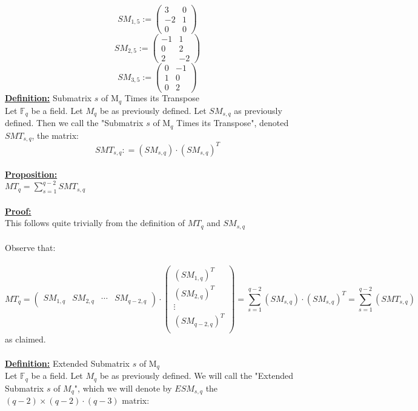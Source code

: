 \documentclass[11pt]{article}
\theoremstyle{plain}
\theoremstyle{definition}
\begin{document}
\[ SM_{1,5} := \left( \begin{array}{cc}
3  & 0  \\
-2 &   1   \\
0 &  0    \end{array} \right)\] 
\[ SM_{2,5} := \left( \begin{array}{cc}
-1  & 1  \\
0 &   2   \\
2 &  -2    \end{array} \right)\] 
\[ SM_{3,5} := \left( \begin{array}{cc}
0  & -1  \\
1 &   0   \\
0 &  2    \end{array} \right)\] 
\textbf{\underline{Definition:}} Submatrix $s$ of M$_q$ Times its Transpose \\
Let $\mathbb{F}_q$ be a field. Let $M_q$ be as previously defined. Let $SM_{s,q}$ as previously defined. Then we call the "Submatrix $s$ of M$_q$ Times its Transpose", denoted $SMT_{s,q}$, the matrix: 
\begin{equation*}
SMT_{s,q} : = (SM_{s,q}) \cdot (SM_{s,q})^T
\end{equation*}
\\
\textbf{\underline{Proposition:}}\\
$MT_q  =  \sum\limits_{s=1}^{q-2} SMT_{s,q}$\\
\\
\textbf{\underline{Proof:}}\\
This follows quite trivially from the definition of $MT_q$ and $SM_{s,q}$\\
\\
Observe that:\\
\\
\[ MT_{q} = \left( \begin{array}{ccccc}
   SM_{1,q} & SM_{2,q} & \cdots & SM_{q-2,q} \end{array} \right)
   \cdot
 \left( \begin{array}{c}
 (SM_{1,q})^T\\
 (SM_{2,q})^T\\
 \vdots \\
  (SM_{q-2,q})^T\\
  \end{array} \right) = \sum\limits_{s=1}^{q-2} (SM_{s,q}) \cdot (SM_{s,q})^T = \sum\limits_{s=1}^{q-2} (SMT_{s,q}) \]
 as claimed.\\
 \\
\textbf{\underline{Definition:}} Extended Submatrix $s$ of M$_q$\\
Let $\mathbb{F}_q$ be a field. Let $M_q$ be as previously defined. We will call the "Extended Submatrix $s$ of $M_q$", which we will denote by $ESM_{s,q}$ the $(q-2) \times (q-2)\cdot(q-3)$ matrix: \\
\end{document}
